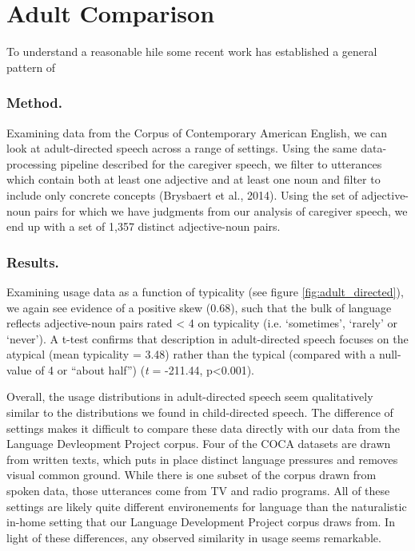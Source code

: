 \documentclass[10pt, letterpaper]{article}
\begin{document}
\hypertarget{adult-comparison}{%
\section{Adult Comparison}\label{adult-comparison}}

To understand a reasonable hile some recent work has established a
general pattern of

\hypertarget{method.-1}{%
\subsubsection{Method.}\label{method.-1}}

Examining data from the Corpus of Contemporary American English, we can
look at adult-directed speech across a range of settings. Using the same
data-processing pipeline described for the caregiver speech, we filter
to utterances which contain both at least one adjective and at least one
noun and filter to include only concrete concepts (Brysbaert et al.,
2014). Using the set of adjective-noun pairs for which we have judgments
from our analysis of caregiver speech, we end up with a set of 1,357
distinct adjective-noun pairs.

\hypertarget{results.-1}{%
\subsubsection{Results.}\label{results.-1}}

Examining usage data as a function of typicality (see figure
\ref{fig:adult_directed}), we again see evidence of a positive skew
(0.68), such that the bulk of language reflects adjective-noun pairs
rated \textless{} 4 on typicality (i.e. `sometimes', `rarely' or
`never'). A t-test confirms that description in adult-directed speech
focuses on the atypical (mean typicality = 3.48) rather than the typical
(compared with a null-value of 4 or ``about half'') (\emph{t} = -211.44,
p\textless{}0.001).

Overall, the usage distributions in adult-directed speech seem
qualitatively similar to the distributions we found in child-directed
speech. The difference of settings makes it difficult to compare these
data directly with our data from the Language Devleopment Project
corpus. Four of the COCA datasets are drawn from written texts, which
puts in place distinct language pressures and removes visual common
ground. While there is one subset of the corpus drawn from spoken data,
those utterances come from TV and radio programs. All of these settings
are likely quite different environements for language than the
naturalistic in-home setting that our Language Development Project
corpus draws from. In light of these differences, any observed
similarity in usage seems remarkable.
\end{document}
